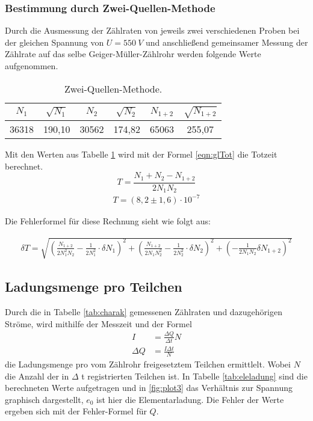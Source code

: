 \subsubsection{Bestimmung durch Zwei-Quellen-Methode}
\label{sec:zwquellen}

Durch die Ausmessung der Zählraten von jeweils zwei verschiedenen Proben bei der gleichen Spannung von $U = \SI{550}{V}$ und anschließend gemeinsamer Messung der Zählrate auf das selbe Geiger-Müller-Zählrohr werden folgende Werte aufgenommen.

\begin{table}
  \centering
  \caption{Zwei-Quellen-Methode.}
  \label{tab:zwquellen}
  \begin{tabular}{c c c c c c}
    \toprule
    $N_1$ & $\sqrt{N_1}$ & $N_2$ & $\sqrt{N_2}$ & $N_{1+2}$ & $\sqrt{N_{1+2}}$\\
    \midrule
    36318 & 190,10 & 30562 & 174,82 & 65063 & 255,07 \\
    \bottomrule
  \end{tabular}
\end{table}
\FloatBarrier

Mit den Werten aus Tabelle \ref{tab:zwquellen} wird mit der Formel \ref{eqn:glTot} die Totzeit berechnet.
\begin{equation}
  T = \frac{N_1+N_2-N_{1+2}}{2N_1N_2}
  \label{eqn:glTot}  
\end{equation}
\begin{align*}
  T = (8,2 \pm 1,6)\cdot 10^{-7}
\end{align*}

Die Fehlerformel für diese Rechnung sieht wie folgt aus:

\begin{align*}
  \delta T = \sqrt{(\frac{N_{1+2}}{2N_1^2N_2}-\frac{1}{2N_1^2}\cdot \delta N_1)^2 + (\frac{N_{1+2}}{2N_1N_2^2}-\frac{1}{2N_2^2}\cdot \delta N_2)^2 + (-\frac{1}{2N_1N_2} \delta N_{1+2})^2}
\end{align*}

\subsection{Ladungsmenge pro Teilchen}
\label{sec:Ladungsmenge}

Durch die in Tabelle \ref{tab:charak} gemessenen Zählraten und dazugehörigen Ströme, wird mithilfe der Messzeit und der Formel
\begin{align*}
  I &= \frac{\Delta Q}{\Delta t} N \\
  \Delta Q &= \frac{I \Delta t}{N}
\end{align*}
die Ladungsmenge pro vom Zählrohr freigesetztem Teilchen ermittlelt.
Wobei $N$ die Anzahl der in $\Delta$ t registrierten Teilchen ist.
In Tabelle \ref{tab:eleladung} sind die berechneten Werte aufgetragen und in \ref{fig:plot3} das Verhältnis zur Spannung graphisch dargestellt, $e_0$ ist hier die Elementarladung.
Die Fehler der Werte ergeben sich mit der Fehler-Formel für $Q$.

